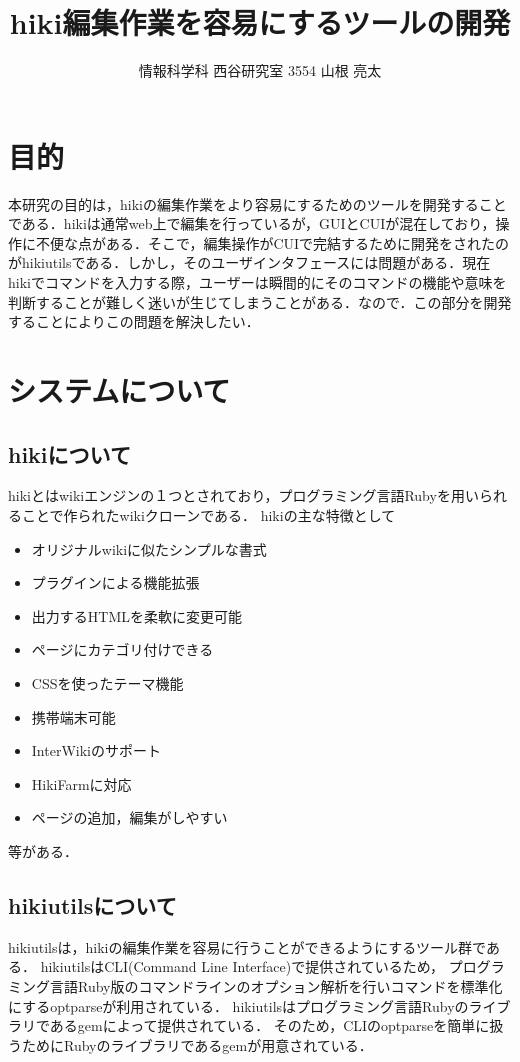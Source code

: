 \documentclass[a4j,twocolumn]{jsarticle}
\begin{document}
\title{hiki編集作業を容易にするツールの開発}
\author{情報科学科 西谷研究室 3554 山根 亮太}
\date{}
\maketitle
\section{目的}
本研究の目的は，hikiの編集作業をより容易にするためのツールを開発することである．hikiは通常web上で編集を行っているが，GUIとCUIが混在しており，操作に不便な点がある．そこで，編集操作がCUIで完結するために開発をされたのがhikiutilsである．しかし，そのユーザインタフェースには問題がある．現在hikiでコマンドを入力する際，ユーザーは瞬間的にそのコマンドの機能や意味を判断することが難しく迷いが生じてしまうことがある．なので．この部分を開発することによりこの問題を解決したい．

\section{システムについて}
\subsection{hikiについて}
hikiとはwikiエンジンの１つとされており，プログラミング言語Rubyを用いられることで作られたwikiクローンである．
hikiの主な特徴として
\begin{itemize}
\item オリジナルwikiに似たシンプルな書式
\item プラグインによる機能拡張
\item 出力するHTMLを柔軟に変更可能
\item ページにカテゴリ付けできる
\item CSSを使ったテーマ機能
\item 携帯端末可能
\item InterWikiのサポート
\item HikiFarmに対応
\item ページの追加，編集がしやすい
\end{itemize}
等がある\cite{hiki}．

\subsection{hikiutilsについて}
hikiutilsは，hikiの編集作業を容易に行うことができるようにするツール群である．
hikiutilsはCLI(Command Line Interface)で提供されているため，
プログラミング言語Ruby版のコマンドラインのオプション解析を行いコマンドを標準化にするoptparseが利用されている\cite{opt}．
hikiutilsはプログラミング言語Rubyのライブラリであるgemによって提供されている\cite{gem}．
そのため，CLIのoptparseを簡単に扱うためにRubyのライブラリであるgemが用意されている．
\end{document}
